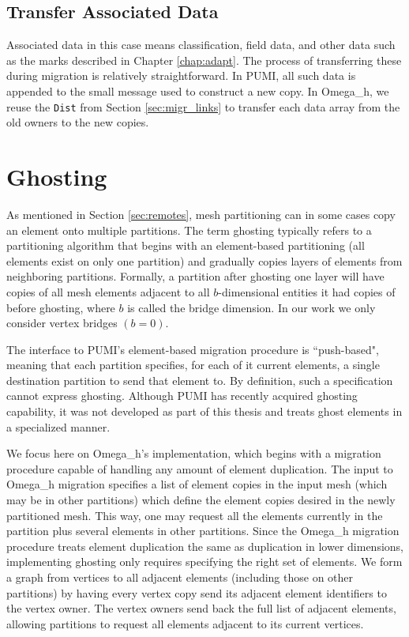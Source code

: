 \subsection{Transfer Associated Data}

Associated data in this case means classification, field data,
and other data such as the marks described in Chapter \ref{chap:adapt}.
The process of transferring these during migration is relatively
straightforward.
In PUMI, all such data is appended to the small message used
to construct a new copy.
In Omega\_h, we reuse the \texttt{Dist} from Section \ref{sec:migr_links}
to transfer each data array from the old owners to the new copies.

\section{Ghosting}
\label{sec:ghost}

As mentioned in Section \ref{sec:remotes}, mesh partitioning can
in some cases copy an element onto multiple partitions.
The term ghosting typically refers to a partitioning algorithm
that begins with an element-based partitioning (all elements
exist on only one partition) and gradually copies layers of elements
from neighboring partitions.
Formally, a partition after ghosting one layer will have copies
of all mesh elements adjacent to all $b$-dimensional entities
it had copies of before ghosting, where $b$ is called the bridge dimension.
In our work we only consider vertex bridges $(b=0)$.

The interface to PUMI's element-based migration procedure is
``push-based", meaning that each partition specifies, for each
of it current elements, a single destination partition to send
that element to.
By definition, such a specification cannot express ghosting.
Although PUMI has recently acquired ghosting capability, it was
not developed as part of this thesis and treats ghost elements
in a specialized manner.

We focus here on Omega\_h's implementation, which begins with
a migration procedure capable of handling any amount of element duplication.
The input to Omega\_h migration specifies a list of element copies
in the input mesh (which may be in other partitions) which define
the element copies desired in the newly partitioned mesh.
This way, one may request all the elements currently in the
partition plus several elements in other partitions.
Since the Omega\_h migration procedure treats element duplication
the same as duplication in lower dimensions, implementing ghosting
only requires specifying the right set of elements.
We form a graph from vertices to all adjacent elements (including
those on other partitions) by having every vertex copy send its
adjacent element identifiers to the vertex owner.
The vertex owners send back the full list of adjacent elements,
allowing partitions to request all elements adjacent to its current
vertices.

